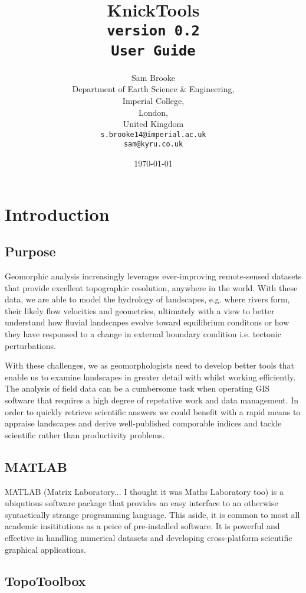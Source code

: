 \documentclass[11pt]{report}
\title{\bf{KnickTools} \protect\\ \texttt{version 0.2} \protect\\  \Huge\texttt{User Guide}}
\author{Sam Brooke\\
  Department of Earth Science \& Engineering,\\
  Imperial College,\\
  London,\\ 
  United Kingdom \\
  \texttt{s.brooke14@imperial.ac.uk}
  \\
  \texttt{sam@kyru.co.uk}
   }
\date{\today}
\begin{document}
\maketitle

\tableofcontents

\chapter{Introduction}

\section{Purpose}

Geomorphic analysis increasingly leverages ever-improving remote-sensed datasets that provide excellent topographic resolution, anywhere in the world. With these data, we are able to model the hydrology of landscapes, e.g. where rivers form, their likely flow velocities and geometries, ultimately with a view to better understand how fluvial landscapes evolve toward equilibrium conditons or how they have responsed to a change in external boundary condition i.e. tectonic perturbations.

With these challenges, we as geomorphologists need to develop better tools that enable us to examine landscapes in greater detail with whilst working efficiently. The analysis of field data can be a cumbersome task when operating GIS software that requires a high degree of repetative work and data management. In order to quickly retrieve scientific answers we could benefit with a rapid means to appraise landscapes and derive well-published comporable indices and tackle scientific rather than productivity problems.

\section{MATLAB}

MATLAB (Matrix Laboratory... I thought it was Maths Laboratory too) is a ubiqutious software package that provides an easy interface to an otherwise syntactically strange programming language. This aside, it is common to most all academic insititutions as a peice of pre-installed software. It is powerful and effective in handling numerical datasets and developing cross-platform scientific graphical applications.

\section{TopoToolbox}
\end{document}
